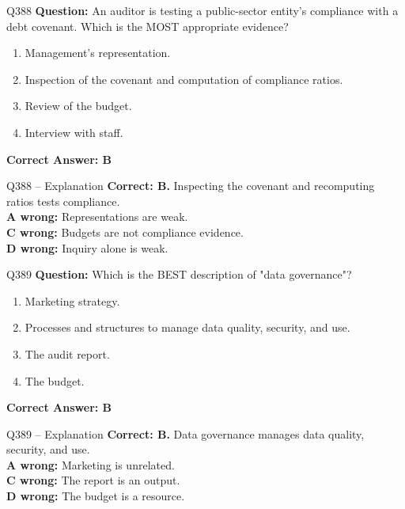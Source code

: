\documentclass[aspectratio=169,10pt]{beamer}
\begin{document}
	\begin{frame}[t]{Q388}
		\small
		\textbf{Question:} An auditor is testing a public-sector entity's compliance with a debt covenant. Which is the MOST appropriate evidence?
		\begin{enumerate}[label=\Alph*.,itemsep=1pt,topsep=2pt]
			\item Management's representation.
			\item Inspection of the covenant and computation of compliance ratios.
			\item Review of the budget.
			\item Interview with staff.
		\end{enumerate}
		\vspace{4pt}
		\textbf{Correct Answer: B}
	\end{frame}
	
	\begin{frame}[t]{Q388 -- Explanation}
		\small
		\textbf{Correct: B.} Inspecting the covenant and recomputing ratios tests compliance. \\[4pt]
		\textbf{A wrong:} Representations are weak. \\[2pt]
		\textbf{C wrong:} Budgets are not compliance evidence. \\[2pt]
		\textbf{D wrong:} Inquiry alone is weak.
	\end{frame}
	
	\begin{frame}[t]{Q389}
		\small
		\textbf{Question:} Which is the BEST description of "data governance"?
		\begin{enumerate}[label=\Alph*.,itemsep=1pt,topsep=2pt]
			\item Marketing strategy.
			\item Processes and structures to manage data quality, security, and use.
			\item The audit report.
			\item The budget.
		\end{enumerate}
		\vspace{4pt}
		\textbf{Correct Answer: B}
	\end{frame}
	
	\begin{frame}[t]{Q389 -- Explanation}
		\small
		\textbf{Correct: B.} Data governance manages data quality, security, and use. \\[4pt]
		\textbf{A wrong:} Marketing is unrelated. \\[2pt]
		\textbf{C wrong:} The report is an output. \\[2pt]
		\textbf{D wrong:} The budget is a resource.
	\end{frame}
	
\end{document}
